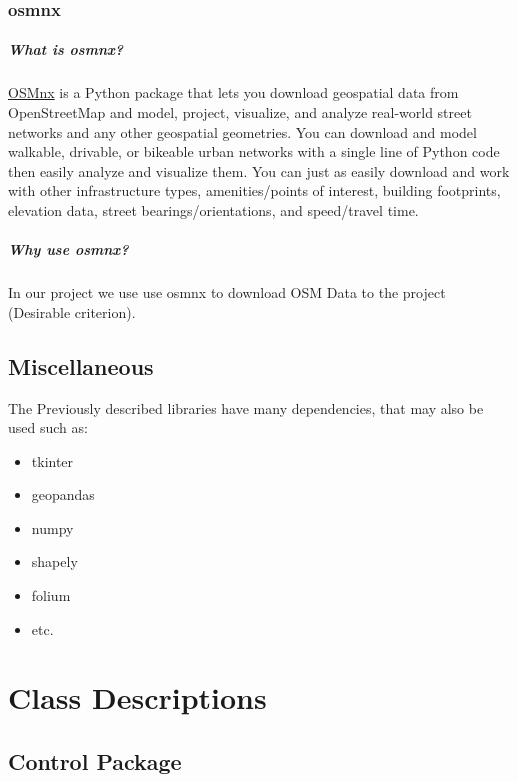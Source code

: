 \documentclass[letterpaper,10pt,english]{sphinxmanual}
\begin{document}
\subsection{osmnx}

\paragraph{What is osmnx?}
\href{https://osmnx.readthedocs.io/en/stable/}{OSMnx} is a Python package that lets you download geospatial data from OpenStreetMap and model, project, visualize, and analyze real-world street networks and any other geospatial geometries. You can download and model walkable, drivable, or bikeable urban networks with a single line of Python code then easily analyze and visualize them. You can just as easily download and work with other infrastructure types, amenities/points of interest, building footprints, elevation data, street bearings/orientations, and speed/travel time.

\paragraph{Why use osmnx?}
In our project we use use osmnx to download OSM Data to the project (Desirable criterion).

\section{Miscellaneous}
The Previously described libraries have many dependencies, that may also be used such as:
\begin{itemize}
    \item tkinter
    \item geopandas
    \item numpy
    \item shapely
    \item folium
    \item etc.
\end{itemize}


\newpage



\chapter{Class Descriptions}
\label{\detokenize{index:class-descriptions}}
\sphinxstepscope


\section{Control Package}
\end{document}
